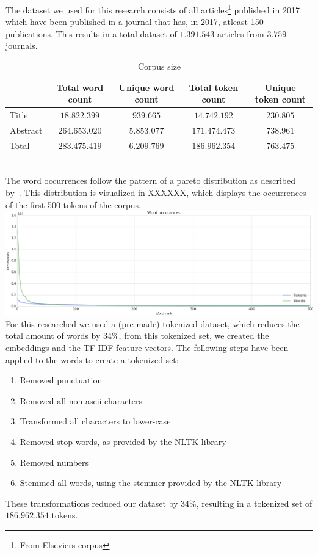 \documentclass[../../Thesis.tex]{subfiles}
\begin{document}
The dataset we used for this research consists of all articles\footnote{From Elseviers corpus} published in 2017 which have been published in a journal that has, in 2017, atleast 150 publications. This results in a total dataset of $1.391.543$ articles from $3.759$ journals.
\begin{table}[hbt]
\begin{center}
\begin{tabular}{|l|c|c|c|c|}
\hline
 & Total word count & Unique word count & Total token count & Unique token count \\
\hline
Title & $18.822.399$ & $939.665$ & $14.742.192$ & $230.805$ \\
\hline
Abstract & $264.653.020$ & $5.853.077$ & $171.474.473$ & $738.961$ \\
\hline
Total & $283.475.419$ & $6.209.769$ & $186.962.354$ & $763.475$ \\
\hline
\end{tabular}
\end{center}
\caption{Corpus size}\label{table:corpusSize}
\end{table}\\
The word occurrences follow the pattern of a pareto distribution as described by~\citet{wiegand2018word}. This distribution is visualized in XXXXXX, which displays the occurrences of the first 500 tokens of the corpus.
\includegraphics[width=6.5in]{Plots/word_occurrences}\\

For this researched we used a (pre-made) tokenized dataset, which reduces the total amount of words by 34\%, from this tokenized set, we created the embeddings and the TF-IDF feature vectors.
The following steps have been applied to the words to create a tokenized set:
\begin{enumerate}
\item{Removed punctuation}
\item{Removed all non-ascii characters}
\item{Transformed all characters to lower-case}
\item{Removed stop-words, as provided by the NLTK library}
\item{Removed numbers}
\item{Stemmed all words, using the stemmer provided by the NLTK library}
\end{enumerate}
These transformations reduced our dataset by 34\%, resulting in a tokenized set of $186.962.354$ tokens.
\end{document}
